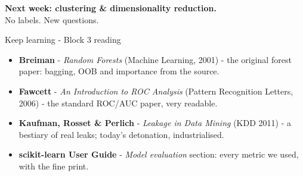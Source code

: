 \documentclass[10pt,aspectratio=169]{beamer}
\begin{document}
\begin{frame}[plain]
  \begin{center}
    \vspace{1.5cm}
    {\LARGE\textbf{Next week: clustering \& dimensionality reduction.}}\\[0.6cm]
    {\normalsize No labels. New questions.}
  \end{center}
\end{frame}

\begin{frame}{Keep learning - Block 3 reading}
  \begin{itemize}
    \item \textbf{Breiman} - \emph{Random Forests} (Machine Learning, 2001)
          - the original forest paper: bagging, OOB and importance from
          the source.
    \item \textbf{Fawcett} - \emph{An Introduction to ROC Analysis}
          (Pattern Recognition Letters, 2006) - the standard ROC/AUC paper,
          very readable.
    \item \textbf{Kaufman, Rosset \& Perlich} - \emph{Leakage in Data
          Mining} (KDD 2011) - a bestiary of real leaks; today's detonation,
          industrialised.
    \item \textbf{scikit-learn User Guide} - \emph{Model evaluation}
          section: every metric we used, with the fine print.
  \end{itemize}
\end{frame}
\end{document}
